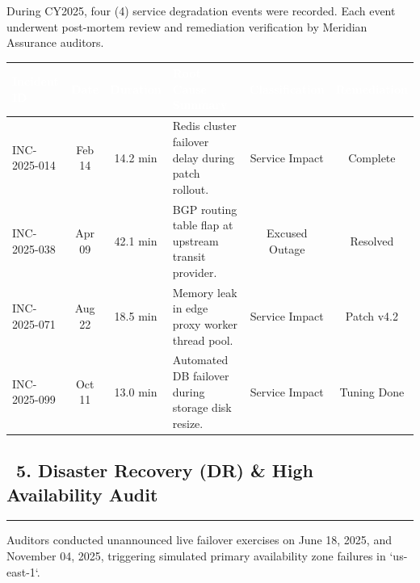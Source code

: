 \documentclass[11pt,a4paper]{scrartcl}
\begin{document}
During CY2025, four (4) service degradation events were recorded. Each event underwent post-mortem review and remediation verification by Meridian Assurance auditors.

\vspace{4pt}

\begin{small}
\begin{tabularx}{\textwidth}{@{} l c c X c c @{}}
    \toprule
    \rowcolor{navyblue}
    \textcolor{white}{\textbf{Incident ID}} & 
    \textcolor{white}{\textbf{Date}} & 
    \textcolor{white}{\textbf{Duration}} & 
    \textcolor{white}{\textbf{Root Cause Summary}} & 
    \textcolor{white}{\textbf{Classification}} & 
    \textcolor{white}{\textbf{Remediation}} \\
    \midrule
    \rowcolor{cardbg} INC-2025-014 & Feb 14 & 14.2 min & Redis cluster failover delay during patch rollout. & Service Impact & Complete \\
    \rowcolor{white} INC-2025-038 & Apr 09 & 42.1 min & BGP routing table flap at upstream transit provider. & Excused Outage & Resolved \\
    \rowcolor{cardbg} INC-2025-071 & Aug 22 & 18.5 min & Memory leak in edge proxy worker thread pool. & Service Impact & Patch v4.2 \\
    \rowcolor{white} INC-2025-099 & Oct 11 & 13.0 min & Automated DB failover during storage disk resize. & Service Impact & Tuning Done \\
    \bottomrule
\end{tabularx}
\end{small}

\vspace{10pt}

\subsection*{\textcolor{navyblue}{\faServer\ 5. Disaster Recovery (DR) \& High Availability Audit}}
\hrule
\vspace{6pt}

Auditors conducted unannounced live failover exercises on June 18, 2025, and November 04, 2025, triggering simulated primary availability zone failures in `us-east-1`.

\vspace{4pt}
\end{document}
